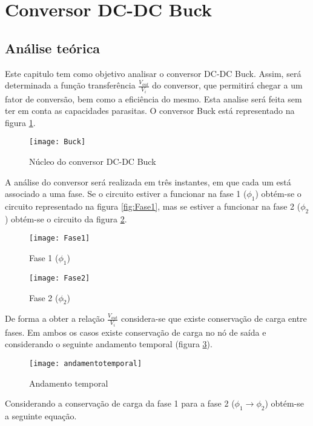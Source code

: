 \documentclass[12pt]{article}
\begin{document}
\section{Conversor DC-DC Buck}
\subsection{Análise teórica}
Este capitulo tem como objetivo analisar o conversor DC-DC Buck. Assim, será determinada a função transferência $\frac{V_{out}}{V_i}$ do conversor, que permitirá chegar a um fator de conversão, bem como a eficiência do mesmo. Esta analise será feita sem ter em conta as capacidades parasitas.
O conversor Buck está representado na figura  \ref{fig:Nucleo_do_conversor_DC-DC_Buck}.
\begin{figure}[htbp]
	\centering
	\texttt{[image: Buck]}
	\caption{Núcleo do conversor DC-DC Buck}
	\label{fig:Nucleo_do_conversor_DC-DC_Buck}
\end{figure}

A análise do conversor será realizada em três instantes, em que cada um está associado a uma fase. Se o circuito estiver a funcionar na fase 1 ($\phi_1$) obtém-se o circuito representado na figura \ref{fig:Fase1}, mas se estiver a funcionar na fase 2 ($\phi_2$) obtém-se o circuito da figura \ref{fig:Fase2}.
	
\begin{figure}[htbp]
\centering
\begin{minipage}{.5\textwidth}
	\centering
	\texttt{[image: Fase1]}
	\caption{Fase 1 ($\phi_1$)}
	\label{fig:Fase1}
\end{minipage}%
\begin{minipage}{.5\textwidth}
	\centering
	\texttt{[image: Fase2]}
	\caption{Fase 2 ($\phi_2$)}
	\label{fig:Fase2}
\end{minipage}
\end{figure}

De forma a obter a relação $\frac{V_{out}}{V_i}$ considera-se que existe conservação de carga entre fases. Em ambos os casos existe conservação de carga no nó de saída e considerando o seguinte andamento temporal (figura \ref{fig:Andamento temporal}).

\begin{figure}[h]
	\centering
	\texttt{[image: andamentotemporal]}
	\caption{Andamento temporal}
	\label{fig:Andamento temporal}
\end{figure}
Considerando a conservação de carga da fase 1 para a fase 2 ($\phi_1 \rightarrow \phi_2$) obtém-se a seguinte equação.
\vspace{5mm}
\end{document}
